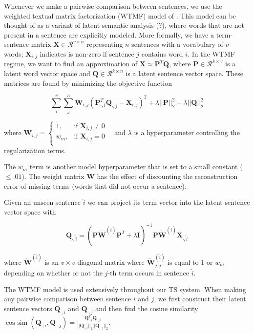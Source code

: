 \documentclass[10pt]{article} \usepackage{url} \usepackage{color}
\begin{document}
Whenever we make a pairwise comparison between sentences, we use the weighted
textual matrix factorization (WTMF) model of \cite{guo2012simple}. This 
model can be thought of as a variant of latent semantic analysis (?), 
where words that are not present in a sentence are explicitly modeled.
More formally, we have a term-sentence matrix 
$\mathbf{X}\in\mathcal{R}^{v \times n}$ representing $n$ sentences with a 
vocabulary of $v$ words; $\mathbf{X}_{i,j}$ indicates is non-zero if sentence
$j$ contains word $i$. In the WTMF regime, we want to find an approximation
of $\mathbf{X} \approx \mathbf{P}^T\mathbf{Q}$, where 
$\mathbf{P} \in \mathcal{R}^{k \times v}$ is a latent word vector space and
$\mathbf{Q} \in \mathcal{R}^{k \times n}$ is a latent sentence vector
space. These matrices are found by minimizing the objective function

$$\sum_i^v \sum_j^n \mathbf{W}_{i,j}(\mathbf{P}_{\cdot,i}^T
\mathbf{Q}_{\cdot,j} 
- \mathbf{X}_{i,j})^2 
 + \lambda ||\mathbf{P}||_2^2 + \lambda ||\mathbf{Q}||_2^2$$

where $\mathbf{W}_{i,j} = 
\begin{cases} 1, & \textrm{if $\mathbf{X}_{i,j} \ne 0$ } \\
w_m, & \textrm{if $\mathbf{X}_{i,j} = 0$ }\\
\end{cases}$
and $\lambda$ is a hyperparameter controlling the regularization terms.

The $w_m$ term is another model hyperparameter that is set to a small constant
($\le .01$). The weight matrix $\mathbf{W}$ has the effect of discounting the
reconstruction error of missing terms (words that did not occur a sentence).

Given an unseen sentence $\hat{i}$ we can project its term vector into the
latent sentence vector space with 

$$
\mathbf{Q}_{\cdot,\hat{i}} = (\mathbf{P}\mathbf{\tilde{W}}^{(\hat{i})}
\mathbf{P}^T  + \lambda\mathbf{I} )^{-1} 
\mathbf{P}\mathbf{\tilde{W}}^{(\hat{i})} \mathbf{X}_{\cdot, \hat{i}}
$$  

where $\mathbf{\tilde{W}}^{(\hat{i})}$ is an $v\times v$ diagonal matrix
where $\mathbf{\tilde{W}}^{(\hat{i})}_{j,j}$ is equal to $1$ or $w_m$ 
depending on whether or not the $j$-th term occurs in sentence $\hat{i}$.


The WTMF model is used extensively throughout our TS system. When making any 
pairwise comparison between sentence $i$ and $j$, we first construct
their latent sentence vectors $\mathbf{Q}_{\cdot,i}$ and
$\mathbf{Q}_{\cdot,j}$ and then find the cosine similarity 
$\displaystyle \operatorname{cos-sim}
(\mathbf{Q}_{\cdot,i}, \mathbf{Q}_{\cdot,j}) = 
\frac{\mathbf{Q}_{\cdot,i}^T\mathbf{Q}_{\cdot,j}}{||\mathbf{Q}_{\cdot,i}||_2
||\mathbf{Q}_{\cdot,j}||_2   }$.
\end{document}
